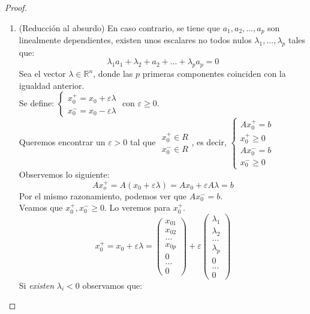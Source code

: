 \documentclass[11pt,fleqn]{book} %
\begin{document}
\begin{proof}
\begin{enumerate}
  \item (Reducción al absurdo) En caso contrario, se tiene que $a_1, a_2, ..., a_p$ son linealmente dependientes, existen unos escalares no todos nulos $\lambda_1, ..., \lambda_p$ tales que:
	$$
	\lambda_1 a_1+\lambda_2+a_2+...+\lambda_p a_p=0
	$$
	Sea el vector $\lambda \in \mathbb{R}^n$, donde las $p$ primeras componentes coinciden con la igualdad anterior. \\
	Se define: $\left\{
	\begin{array}{c}
	  x_0^+=x_0+\varepsilon \lambda \\
	  x_0^-=x_0-\varepsilon \lambda
	\end{array}
	\right.$ con $\varepsilon \geq 0$. \\
	Queremos encontrar un $\varepsilon>0$ tal que $\begin{array}{c}
	  x_0^+ \in R \\
	  x_0^- \in R
	\end{array}$, es decir, $\left\{
	\begin{array}{c}
	  Ax_0^+=b \\x_0^+ \geq 0 \\ Ax_0^-=b \\ x_0^- \geq 0
	\end{array}\right.$ \\
	Observemos lo siguiente:
	$$
	Ax_o^+=A(x_0+\varepsilon \lambda)=Ax_0+ \varepsilon A \lambda = b
	$$
	Por el mismo razonamiento, podemos ver que $Ax_0^-=b$.  \\
	Veamos que $x_0^+, x_0^- \geq 0$. Lo veremos para $x_0^+$.
	$$
	x_0^+=x_0+\varepsilon \lambda=\left(\begin{array}{c}
	  x_{01} \\
	  x_{02} \\
	  ... \\
	  x_{0p} \\
	  0 \\
	  ... \\
	  0
	\end{array}\right)+\varepsilon\left(\begin{array}{c}
	  \lambda_{1} \\
	  \lambda_{2} \\
	  ... \\
	  \lambda_{p} \\
	  0 \\
	  ... \\
	  0
	\end{array}\right)
	$$
	Si \textit{existen} $\lambda_i < 0$ observamos que:

\end{enumerate}
\end{proof}
\end{document}
